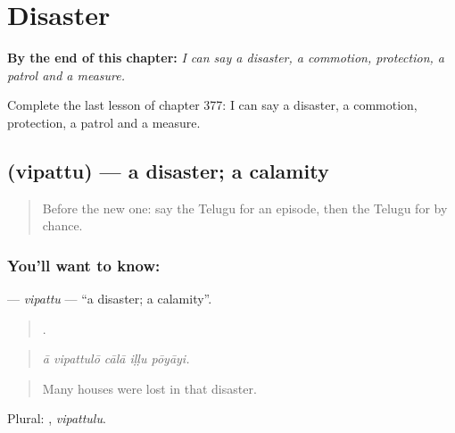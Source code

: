 
\chapter{Disaster}
\label{ch:te-disaster}

\begin{chapteropening}
\textbf{By the end of this chapter:} \emph{I can say a disaster, a commotion, protection, a patrol and a measure.}

Complete the last lesson of chapter 377: I can say a disaster, a commotion, protection, a patrol and a measure.
\end{chapteropening}

\section[\texorpdfstring{\te{విపత్తు} (vipattu)}{విపత్తు (vipattu)}]{ (vipattu) — a disaster; a calamity}

\label{lesson:TE-C377-vipattu}



\begin{quote}
Before the new one: say the Telugu for an episode, then the Telugu for by chance.
\end{quote}

\subsection*{You'll want to know: }
\textbf{} — \emph{vipattu} — \textquotedblleft{}a disaster; a calamity\textquotedblright{}.

\begin{quote}
    .
\end{quote}

\begin{quote}
\emph{ā vipattulō cālā iḷḷu pōyāyi.}
\end{quote}

\begin{quote}
Many houses were lost in that disaster.
\end{quote}

Plural: , \emph{vipattulu}.

